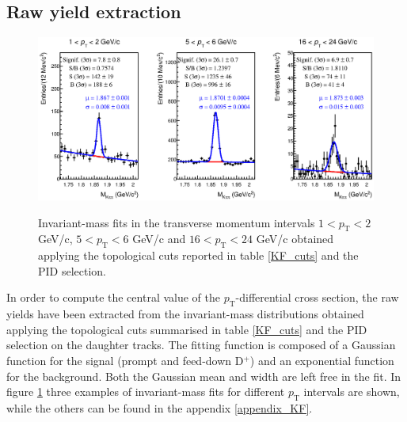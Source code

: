 \documentclass[b5paper,10pt,twoside,oldstyle,classica]{toptesi}
\newcommand{\pt}{p_\text{T}}
\begin{document}
\subsection{Raw yield extraction}
\label{KF_rawyield}
\begin{figure}[b]
\begin{center}
{\includegraphics[scale = 0.65]{MassFits_KF_Pt_0_4_9.eps}}
\caption{Invariant-mass fits in the transverse momentum intervals $1 < \pt < 2$ GeV/c, $5 < \pt < 6$ GeV/c and $16 < \pt < 24$ GeV/c obtained applying the topological cuts reported in table \ref{KF_cuts} and the PID selection.}
\label{KF_rawyield_ext}
\end{center}
\end{figure} 
In order to compute the central value of the $\pt$-differential cross section, the raw yields have been extracted from the invariant-mass distributions obtained applying the topological cuts summarised in table \ref{KF_cuts} and the PID selection on the daughter tracks. The fitting function is composed of a Gaussian function for the signal (prompt and feed-down D$^+$) and an exponential function for the background. Both the Gaussian mean and width are left free in the fit. In figure \ref{KF_rawyield_ext} three examples of invariant-mass fits for different $\pt$ intervals are shown, while the others can be found in the appendix \ref{appendix_KF}. 
\end{document}
